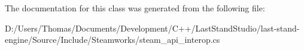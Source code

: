 The documentation for this class was generated from the following file\+:\begin{DoxyCompactItemize}
\item 
D\+:/\+Users/\+Thomas/\+Documents/\+Development/\+C++/\+Last\+Stand\+Studio/last-\/stand-\/engine/\+Source/\+Include/\+Steamworks/steam\+\_\+api\+\_\+interop.\+cs\end{DoxyCompactItemize}
